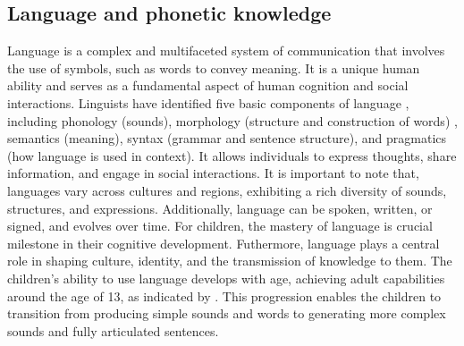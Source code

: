 \subsection{Language and phonetic knowledge} %
\label{subsection:mispron}
Language is a complex and multifaceted system of communication that involves the use of symbols, such as words to convey meaning. It is a unique human ability and serves as a fundamental aspect of human cognition and social interactions. Linguists have identified five basic components of language \cite{moats2000speech}, including phonology (sounds), morphology (structure and construction of words) , semantics (meaning), syntax (grammar and sentence structure), and pragmatics (how language is used in context). It allows individuals to express thoughts, share information, and engage in social interactions. It is important to note that, languages vary across cultures and regions, exhibiting a rich diversity of sounds, structures, and expressions. Additionally, language can be spoken, written, or signed, and evolves over time. For children, the mastery of language is crucial milestone in their cognitive development. Futhermore, language plays a central role in shaping culture, identity, and the transmission of knowledge to them. The children's ability to use language develops with age, achieving adult capabilities around the age of 13, as indicated by \cite{Acoustic_change_children}. This progression enables the children to transition from producing simple sounds and words to generating more complex sounds and fully articulated sentences.

